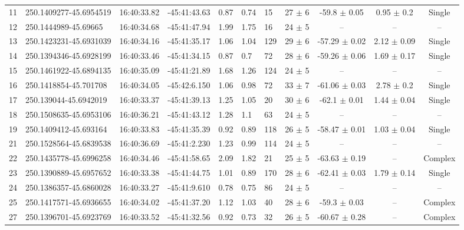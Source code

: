 \begin{table}[htbp!]
\begin{tabular}{llllllllccc}
11  &  250.1409277-45.6954519  &  16:40:33.82  &  -45:41:43.63  &  0.87  &  0.74  &  15  &  27 $\pm$ 6  &  -59.8 $\pm$ 0.05  &  0.95 $\pm$ 0.2  &  Single \\
12  &  250.1444989-45.69665  &  16:40:34.68  &  -45:41:47.94  &  1.99  &  1.75  &  16  &  24 $\pm$ 5  &  --  &  --  &  -- \\
13  &  250.1423231-45.6931039  &  16:40:34.16  &  -45:41:35.17  &  1.06  &  1.04  &  129  &  29 $\pm$ 6  &  -57.29 $\pm$ 0.02  &  2.12 $\pm$ 0.09  &  Single \\
14  &  250.1394346-45.6928199  &  16:40:33.46  &  -45:41:34.15  &  0.87  &  0.7  &  72  &  28 $\pm$ 6  &  -59.26 $\pm$ 0.06  &  1.69 $\pm$ 0.17  &  Single \\
15  &  250.1461922-45.6894135  &  16:40:35.09  &  -45:41:21.89  &  1.68  &  1.26  &  124  &  24 $\pm$ 5  &  --  &  --  &  -- \\
16  &  250.1418854-45.701708  &  16:40:34.05  &  -45:42:6.150  &  1.06  &  0.98  &  72  &  33 $\pm$ 7  &  -61.06 $\pm$ 0.03  &  2.78 $\pm$ 0.2  &  Single \\
17  &  250.139044-45.6942019  &  16:40:33.37  &  -45:41:39.13  &  1.25  &  1.05  &  20  &  30 $\pm$ 6  &  -62.1 $\pm$ 0.01  &  1.44 $\pm$ 0.04  &  Single \\
18  &  250.1508635-45.6953106  &  16:40:36.21  &  -45:41:43.12  &  1.28  &  1.1  &  63  &  24 $\pm$ 5  &  --  &  --  &  -- \\
19  &  250.1409412-45.693164  &  16:40:33.83  &  -45:41:35.39  &  0.92  &  0.89  &  118  &  26 $\pm$ 5  &  -58.47 $\pm$ 0.01  &  1.03 $\pm$ 0.04  &  Single \\
21  &  250.1528564-45.6839538  &  16:40:36.69  &  -45:41:2.230  &  1.23  &  0.99  &  114  &  24 $\pm$ 5  &  --  &  --  &  -- \\
22  &  250.1435778-45.6996258  &  16:40:34.46  &  -45:41:58.65  &  2.09  &  1.82  &  21  &  25 $\pm$ 5  &  -63.63 $\pm$ 0.19  &  --  &  Complex \\
23  &  250.1390889-45.6957652  &  16:40:33.38  &  -45:41:44.75  &  1.01  &  0.89  &  170  &  28 $\pm$ 6  &  -62.41 $\pm$ 0.03  &  1.79 $\pm$ 0.14  &  Single \\
24  &  250.1386357-45.6860028  &  16:40:33.27  &  -45:41:9.610  &  0.78  &  0.75  &  86  &  24 $\pm$ 5  &  --  &  --  &  -- \\
25  &  250.1417571-45.6936655  &  16:40:34.02  &  -45:41:37.20  &  1.12  &  1.03  &  40  &  28 $\pm$ 6  &  -59.3 $\pm$ 0.03  &  --  &  Complex \\
27  &  250.1396701-45.6923769  &  16:40:33.52  &  -45:41:32.56  &  0.92  &  0.73  &  32  &  26 $\pm$ 5  &  -60.67 $\pm$ 0.28  &  --  &  Complex \\

\end{tabular}
\end{table}
